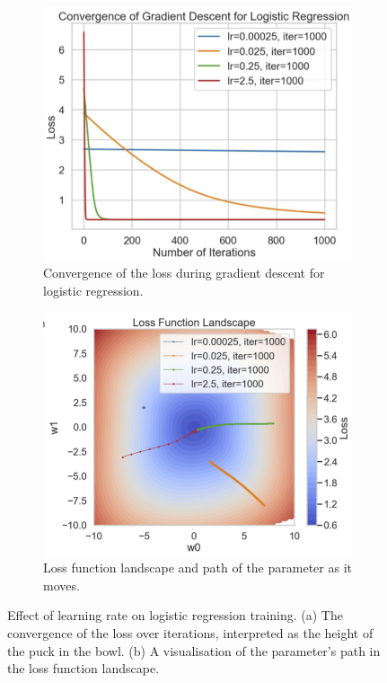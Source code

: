 \begin{figure}[h!]
    \centering
    \begin{subfigure}[b]{0.49\linewidth}
        \centering
        \includegraphics[width=\linewidth]{img/3_logr_gd.png}
        \caption{Convergence of the loss during gradient descent for logistic regression.}
        \label{fig:logr_gd}
    \end{subfigure}
    \begin{subfigure}[b]{0.49\linewidth}
        \centering
        \includegraphics[width=\linewidth]{img/3_logr_loss_function_landscape.png}
        \caption{Loss function landscape and path of the parameter as it moves.}
        \label{fig:logr_loss_landscape}
    \end{subfigure}

    \caption{Effect of learning rate on logistic regression training. (a) The convergence of the loss over iterations, interpreted as the height of the puck in the bowl. (b) A visualisation of the parameter's path in the loss function landscape.}
    \label{fig:logr_learning_rate_effect}
\end{figure}


